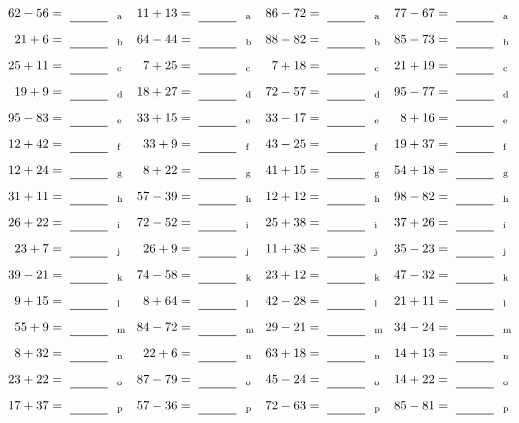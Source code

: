 \documentclass
[
  draft    = true,
  fontsize = 11pt,
  parskip  = half-
]
{scrartcl}
\begin{document}
\clearpage
\begin{align*}
    \pline{62-56}&=\rline{a}
  & \pline{11+13}&=\rline{a}
  & \pline{86-72}&=\rline{a}
  & \pline{77-67}&=\rline{a} \\[1ex]
    \pline{21+6}&=\rline{b}
  & \pline{64-44}&=\rline{b}
  & \pline{88-82}&=\rline{b}
  & \pline{85-73}&=\rline{b} \\[1ex]
    \pline{25+11}&=\rline{c}
  & \pline{7+25}&=\rline{c}
  & \pline{7+18}&=\rline{c}
  & \pline{21+19}&=\rline{c} \\[1ex]
    \pline{19+9}&=\rline{d}
  & \pline{18+27}&=\rline{d}
  & \pline{72-57}&=\rline{d}
  & \pline{95-77}&=\rline{d} \\[1ex]
    \pline{95-83}&=\rline{e}
  & \pline{33+15}&=\rline{e}
  & \pline{33-17}&=\rline{e}
  & \pline{8+16}&=\rline{e} \\[1ex]
    \pline{12+42}&=\rline{f}
  & \pline{33+9}&=\rline{f}
  & \pline{43-25}&=\rline{f}
  & \pline{19+37}&=\rline{f} \\[1ex]
    \pline{12+24}&=\rline{g}
  & \pline{8+22}&=\rline{g}
  & \pline{41+15}&=\rline{g}
  & \pline{54+18}&=\rline{g} \\[1ex]
    \pline{31+11}&=\rline{h}
  & \pline{57-39}&=\rline{h}
  & \pline{12+12}&=\rline{h}
  & \pline{98-82}&=\rline{h} \\[1ex]
    \pline{26+22}&=\rline{i}
  & \pline{72-52}&=\rline{i}
  & \pline{25+38}&=\rline{i}
  & \pline{37+26}&=\rline{i} \\[1ex]
    \pline{23+7}&=\rline{j}
  & \pline{26+9}&=\rline{j}
  & \pline{11+38}&=\rline{j}
  & \pline{35-23}&=\rline{j} \\[1ex]
    \pline{39-21}&=\rline{k}
  & \pline{74-58}&=\rline{k}
  & \pline{23+12}&=\rline{k}
  & \pline{47-32}&=\rline{k} \\[1ex]
    \pline{9+15}&=\rline{l}
  & \pline{8+64}&=\rline{l}
  & \pline{42-28}&=\rline{l}
  & \pline{21+11}&=\rline{l} \\[1ex]
    \pline{55+9}&=\rline{m}
  & \pline{84-72}&=\rline{m}
  & \pline{29-21}&=\rline{m}
  & \pline{34-24}&=\rline{m} \\[1ex]
    \pline{8+32}&=\rline{n}
  & \pline{22+6}&=\rline{n}
  & \pline{63+18}&=\rline{n}
  & \pline{14+13}&=\rline{n} \\[1ex]
    \pline{23+22}&=\rline{o}
  & \pline{87-79}&=\rline{o}
  & \pline{45-24}&=\rline{o}
  & \pline{14+22}&=\rline{o} \\[1ex]
    \pline{17+37}&=\rline{p}
  & \pline{57-36}&=\rline{p}
  & \pline{72-63}&=\rline{p}
  & \pline{85-81}&=\rline{p}
\end{align*}
\end{document}
